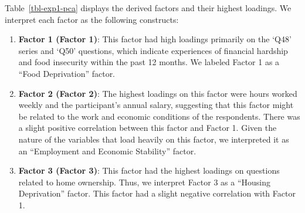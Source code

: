 \documentclass[
]{article}
\begin{document}
Table~\ref{tbl-exp1-pca} displays the derived factors and their highest
loadings. We interpret each factor as the following constructs:

\begin{enumerate}
\def\labelenumi{\arabic{enumi}.}
\item
  \textbf{Factor 1 (Factor 1)}: This factor had high loadings primarily
  on the `Q48' series and `Q50' questions, which indicate experiences of
  financial hardship and food insecurity within the past 12 months. We
  labeled Factor 1 as a ``Food Deprivation'' factor.
\item
  \textbf{Factor 2 (Factor 2)}: The highest loadings on this factor were
  hours worked weekly and the participant's annual salary, suggesting
  that this factor might be related to the work and economic conditions
  of the respondents. There was a slight positive correlation between
  this factor and Factor 1. Given the nature of the variables that load
  heavily on this factor, we interpreted it as an ``Employment and
  Economic Stability'' factor.
\item
  \textbf{Factor 3 (Factor 3)}: This factor had the highest loadings on
  questions related to home ownership. Thus, we interpret Factor 3 as a
  ``Housing Deprivation'' factor. This factor had a slight negative
  correlation with Factor 1.
\end{enumerate}
\end{document}
